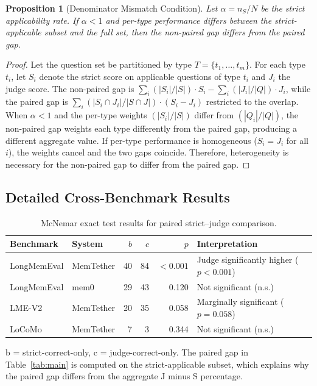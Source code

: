 \documentclass{article}
\newtheorem{proposition}{Proposition}
\begin{document}
\begin{proposition}[Denominator Mismatch Condition]
Let $\alpha = n_S / N$ be the strict applicability rate. If $\alpha < 1$ and per-type performance differs between the strict-applicable subset and the full set, then the non-paired gap differs from the paired gap.
\end{proposition}
\begin{proof}
Let the question set be partitioned by type $T = \{t_1, \ldots, t_m\}$. For each type $t_i$, let $S_i$ denote the strict score on applicable questions of type $t_i$ and $J_i$ the judge score. The non-paired gap is $\sum_i (|S_i|/|S|) \cdot S_i - \sum_i (|J_i|/|Q|) \cdot J_i$, while the paired gap is $\sum_i (|S_i \cap J_i|/|S \cap J|) \cdot (S_i - J_i)$ restricted to the overlap. When $\alpha < 1$ and the per-type weights $(|S_i|/|S|)$ differ from $(|Q_i|/|Q|)$, the non-paired gap weights each type differently from the paired gap, producing a different aggregate value. If per-type performance is homogeneous ($S_i = J_i$ for all $i$), the weights cancel and the two gaps coincide. Therefore, heterogeneity is necessary for the non-paired gap to differ from the paired gap.
\end{proof}

\subsection{Detailed Cross-Benchmark Results}

\begin{table}[h]
\centering
\caption{McNemar exact test results for paired strict--judge comparison.}
\label{tab:mcnemar}
\begin{tabular}{llrrrl}
\toprule
Benchmark & System & $b$ & $c$ & $p$ & Interpretation \\
\midrule
LongMemEval & MemTether & 40 & 84 & $<0.001$ & Judge significantly higher ($p<0.001$) \\
LongMemEval & mem0 & 29 & 43 & 0.120 & Not significant (n.s.) \\
LME-V2 & MemTether & 20 & 35 & 0.058 & Marginally significant ($p=0.058$) \\
LoCoMo & MemTether & 7 & 3 & 0.344 & Not significant (n.s.) \\
\bottomrule
\end{tabular}
\vspace{2mm}
\footnotesize{b = strict-correct-only, c = judge-correct-only. The paired gap in Table~\ref{tab:main} is computed on the strict-applicable subset, which explains why the paired gap differs from the aggregate J minus S percentage.}
\end{table}
\end{document}

